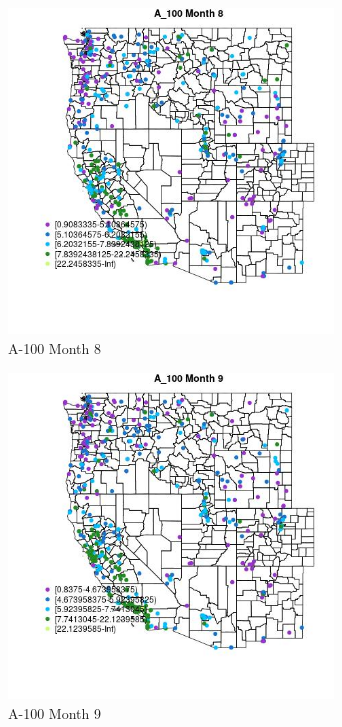\clearpage 

\begin{figure} 
\centering  
\includegraphics[width=0.77\textwidth]{Code_Outputs/ML_input_report_ML_input_PM25_Step5_part_d_de_duplicated_aves_ML_input_MapObsMo8A_100.jpg} 
\caption{\label{fig:ML_input_report_ML_input_PM25_Step5_part_d_de_duplicated_aves_ML_inputMapObsMo8A_100}A-100 Month 8} 
\end{figure} 
 

\begin{figure} 
\centering  
\includegraphics[width=0.77\textwidth]{Code_Outputs/ML_input_report_ML_input_PM25_Step5_part_d_de_duplicated_aves_ML_input_MapObsMo9A_100.jpg} 
\caption{\label{fig:ML_input_report_ML_input_PM25_Step5_part_d_de_duplicated_aves_ML_inputMapObsMo9A_100}A-100 Month 9} 
\end{figure} 
 

